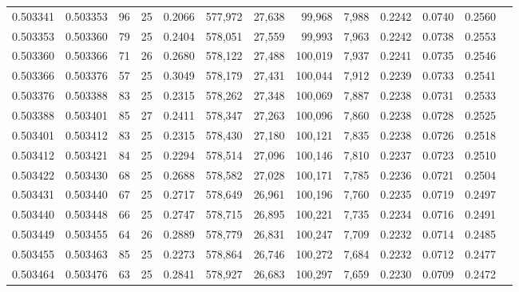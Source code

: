 \begin{tabular}{rrrrrrrrrrrrr}
0.503341 & 0.503353 &  96 &  25 &                                     0.2066 & 577,972 &  27,638 &  99,968 &   7,988 & 0.2242 & 0.0740 & 0.2560 \\
0.503353 & 0.503360 &  79 &  25 &                                     0.2404 & 578,051 &  27,559 &  99,993 &   7,963 & 0.2242 & 0.0738 & 0.2553 \\
0.503360 & 0.503366 &  71 &  26 &                                     0.2680 & 578,122 &  27,488 & 100,019 &   7,937 & 0.2241 & 0.0735 & 0.2546 \\
0.503366 & 0.503376 &  57 &  25 &                                     0.3049 & 578,179 &  27,431 & 100,044 &   7,912 & 0.2239 & 0.0733 & 0.2541 \\
0.503376 & 0.503388 &  83 &  25 &                                     0.2315 & 578,262 &  27,348 & 100,069 &   7,887 & 0.2238 & 0.0731 & 0.2533 \\
0.503388 & 0.503401 &  85 &  27 &                                     0.2411 & 578,347 &  27,263 & 100,096 &   7,860 & 0.2238 & 0.0728 & 0.2525 \\
0.503401 & 0.503412 &  83 &  25 &                                     0.2315 & 578,430 &  27,180 & 100,121 &   7,835 & 0.2238 & 0.0726 & 0.2518 \\
0.503412 & 0.503421 &  84 &  25 &                                     0.2294 & 578,514 &  27,096 & 100,146 &   7,810 & 0.2237 & 0.0723 & 0.2510 \\
0.503422 & 0.503430 &  68 &  25 &                                     0.2688 & 578,582 &  27,028 & 100,171 &   7,785 & 0.2236 & 0.0721 & 0.2504 \\
0.503431 & 0.503440 &  67 &  25 &                                     0.2717 & 578,649 &  26,961 & 100,196 &   7,760 & 0.2235 & 0.0719 & 0.2497 \\
0.503440 & 0.503448 &  66 &  25 &                                     0.2747 & 578,715 &  26,895 & 100,221 &   7,735 & 0.2234 & 0.0716 & 0.2491 \\
0.503449 & 0.503455 &  64 &  26 &                                     0.2889 & 578,779 &  26,831 & 100,247 &   7,709 & 0.2232 & 0.0714 & 0.2485 \\
0.503455 & 0.503463 &  85 &  25 &                                     0.2273 & 578,864 &  26,746 & 100,272 &   7,684 & 0.2232 & 0.0712 & 0.2477 \\
0.503464 & 0.503476 &  63 &  25 &                                     0.2841 & 578,927 &  26,683 & 100,297 &   7,659 & 0.2230 & 0.0709 & 0.2472 \\

\end{tabular}
